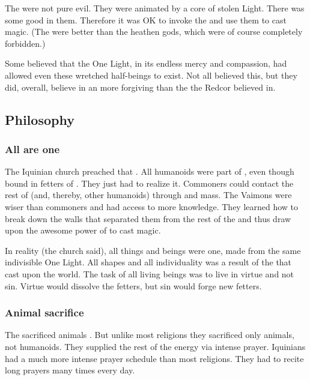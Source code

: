 The \qliphoth were not pure evil.
They were animated by a core of stolen Light.
There was some good in them. 
Therefore it was OK to invoke the \qliphoth and use them to cast magic. 
(The \qliphoth were better than the heathen gods, which were of course completely forbidden.)

Some believed that the One Light, in its endless mercy and compassion, had allowed even these wretched half-beings to exist.
Not all \Telcras believed this, but they did, overall, believe in an \Iquin more forgiving than the \Iquin the Redcor believed in. 









\subsection{Philosophy}





\subsubsection{All are one}
The Iquinian church preached that . 
All humanoids were part of \iquin, even though bound in fetters of \itzach.
They just had to realize it. 
Commoners could contact the rest of \iquin (and, thereby, other humanoids) through  and mass. 
The Vaimons were wiser than commoners and had access to more knowledge. 
They learned how to break down the walls that separated them from the rest of the \iquin and thus draw upon the awesome power of \iquin to cast magic. 

In reality (the church said), all things and beings were one, made from the same indivisible One Light. 
All shapes and all individuality was a result of the  that \itzach cast upon the world. 
The task of all living beings was to live in virtue and not sin.
Virtue would dissolve the fetters, but sin would forge new fetters. 





\subsubsection{Animal sacrifice}
The \iquinians sacrificed animals . 
But unlike most religions they sacrificed only animals, not humanoids.
They supplied the rest of the energy via intense prayer.
Iquinians had a much more intense prayer schedule than most religions. 
They had to recite long prayers many times every day.





